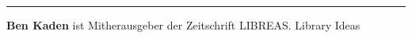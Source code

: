\begin{center}\rule{0.5\linewidth}{0.5pt}\end{center}

\textbf{Ben Kaden} ist Mitherausgeber der Zeitschrift LIBREAS. Library
Ideas
